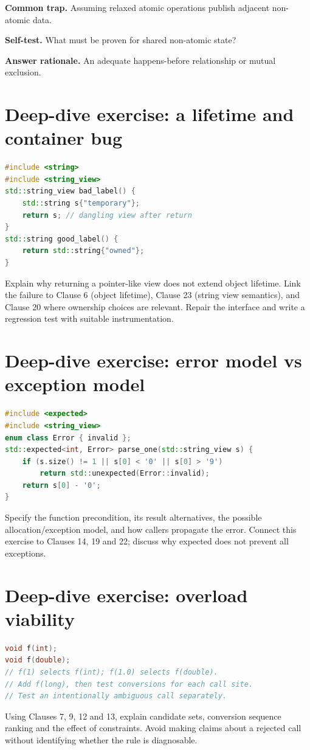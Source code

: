 \documentclass[11pt]{article}
\begin{document}
\textbf{Common trap.} Assuming relaxed atomic operations publish adjacent non-atomic data.

\textbf{Self-test.} What must be proven for shared non-atomic state?

\textbf{Answer rationale.} An adequate happens-before relationship or mutual exclusion.

\section{Deep-dive exercise: a lifetime and container bug}
\begin{lstlisting}[language=C++]
#include <string>
#include <string_view>
std::string_view bad_label() {
    std::string s{"temporary"};
    return s; // dangling view after return
}
std::string good_label() {
    return std::string{"owned"};
}
\end{lstlisting}
Explain why returning a pointer-like view does not extend object lifetime. Link the failure to Clause 6 (object lifetime), Clause 23 (string view semantics), and Clause 20 where ownership choices are relevant. Repair the interface and write a regression test with suitable instrumentation.

\section{Deep-dive exercise: error model vs exception model}
\begin{lstlisting}[language=C++]
#include <expected>
#include <string_view>
enum class Error { invalid };
std::expected<int, Error> parse_one(std::string_view s) {
    if (s.size() != 1 || s[0] < '0' || s[0] > '9')
        return std::unexpected(Error::invalid);
    return s[0] - '0';
}
\end{lstlisting}
Specify the function precondition, its result alternatives, the possible allocation/exception model, and how callers propagate the error. Connect this exercise to Clauses 14, 19 and 22; discuss why expected does not prevent all exceptions.

\section{Deep-dive exercise: overload viability}
\begin{lstlisting}[language=C++]
void f(int);
void f(double);
// f(1) selects f(int); f(1.0) selects f(double).
// Add f(long), then test conversions for each call site.
// Test an intentionally ambiguous call separately.
\end{lstlisting}
Using Clauses 7, 9, 12 and 13, explain candidate sets, conversion sequence ranking and the effect of constraints. Avoid making claims about a rejected call without identifying whether the rule is diagnosable.
\end{document}
